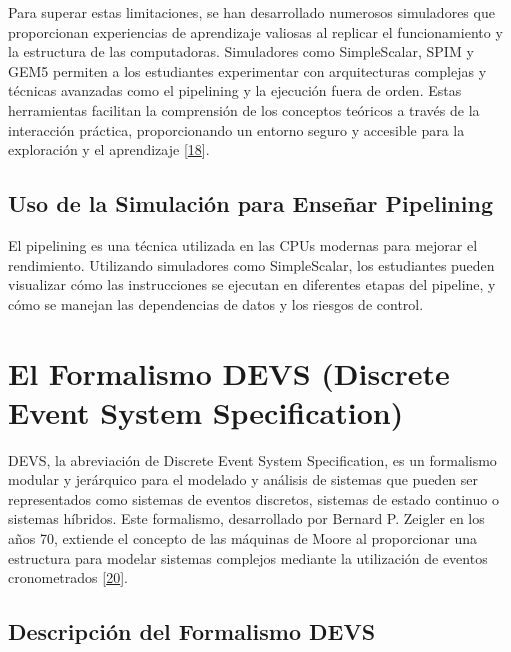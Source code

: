 \documentclass[12pt,twoside]{templates/unerthesis}
\begin{document}
Para superar estas limitaciones, se han desarrollado numerosos simuladores que proporcionan experiencias de aprendizaje valiosas al replicar el funcionamiento y la estructura de las computadoras. Simuladores como SimpleScalar, SPIM y GEM5 permiten a los estudiantes experimentar con arquitecturas complejas y técnicas avanzadas como el pipelining y la ejecución fuera de orden. Estas herramientas facilitan la comprensión de los conceptos teóricos a través de la interacción práctica, proporcionando un entorno seguro y accesible para la exploración y el aprendizaje {[}\protect\hyperlink{ref-skrien_cpu_2001}{18}{]}.

\hypertarget{uso-de-la-simulaciuxf3n-para-enseuxf1ar-pipelining}{%
\subsection{Uso de la Simulación para Enseñar Pipelining}\label{uso-de-la-simulaciuxf3n-para-enseuxf1ar-pipelining}}

El pipelining es una técnica utilizada en las CPUs modernas para mejorar el rendimiento. Utilizando simuladores como SimpleScalar, los estudiantes pueden visualizar cómo las instrucciones se ejecutan en diferentes etapas del pipeline, y cómo se manejan las dependencias de datos y los riesgos de control.

\hypertarget{el-formalismo-devs-discrete-event-system-specification}{%
\section{El Formalismo DEVS (Discrete Event System Specification)}\label{el-formalismo-devs-discrete-event-system-specification}}

DEVS, la abreviación de Discrete Event System Specification, es un formalismo modular y jerárquico para el modelado y análisis de sistemas que pueden ser representados como sistemas de eventos discretos, sistemas de estado continuo o sistemas híbridos. Este formalismo, desarrollado por Bernard P. Zeigler en los años 70, extiende el concepto de las máquinas de Moore al proporcionar una estructura para modelar sistemas complejos mediante la utilización de eventos cronometrados {[}\protect\hyperlink{ref-zeigler_theory_2000}{20}{]}.

\hypertarget{descripciuxf3n-del-formalismo-devs}{%
\subsection{Descripción del Formalismo DEVS}\label{descripciuxf3n-del-formalismo-devs}}
\end{document}
